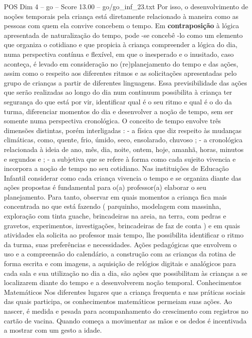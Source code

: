 \begin{textsample}{POS Dim 4 – go – Score 13.00 – go/go\_inf\_23.txt}
Por isso, o desenvolvimento de noções temporais pela criança está diretamente relacionado à maneira como as pessoas com quem ela convive concebem o tempo.
Em \textbf{contraposição} à lógica apresentada de naturalização do tempo, pode -se concebê -lo como um elemento que organiza o cotidiano e que propicia à criança compreender a lógica do dia, numa perspectiva contínua e flexível, em que o inesperado e o inusitado, caso aconteça, é levado em consideração no (re)planejamento do tempo e das ações, assim como o respeito aos diferentes ritmos e as solicitações apresentadas pelo grupo de crianças a partir de diferentes linguagens.
Essa previsibilidade das ações que serão realizadas ao longo do dia num continuum possibilita à criança ter segurança do que está por vir, identificar qual é o seu ritmo e qual é o do da turma, diferenciar momentos do dia e desenvolver a noção de tempo, sem ser somente numa perspectiva cronológica.
O conceito de tempo envolve três dimensões distintas, porém interligadas : - a física que diz respeito às mudanças climáticas, como, quente, frio, úmido, seco, ensolarado, chuvoso ; - a cronológica relacionada à ideia de ano, mês, dia, noite, ontem, hoje, amanhã, horas, minutos e segundos e ; - a subjetiva que se refere à forma como cada sujeito vivencia e incorpora a noção de tempo no seu cotidiano.
Nas instituições de Educação Infantil considerar como cada criança vivencia o tempo e se organiza diante das ações propostas é fundamental para o(a) professor(a) elaborar o seu planejamento.
Para tanto, observar em quais momentos a criança fica mais concentrada no que está fazendo ( parquinho, modelagem com massinha, exploração com tinta guache, brincadeiras na areia, na terra, com pedras e gravetos, experimentos, investigações, brincadeiras de faz de conta ) e em quais atividades ela solicita ao professor mais tempo, lhe possibilita identificar o ritmo da turma, suas preferências e necessidades.
Ações pedagógicas que envolvem o uso e a compreensão do calendário, a construção com as crianças da rotina de forma escrita e com imagens, a aquisição de relógios digitais e analógicos para cada sala e sua utilização no dia a dia, são ações que possibilitam às crianças a se localizarem diante do tempo e a desenvolverem noção temporal.
Conhecimentos Matemáticos Nos diferentes lugares que a criança frequenta e nas práticas sociais das quais participa, os conhecimentos matemáticos permeiam suas ações.
Ao nascer, é medida e pesada para acompanhamento do crescimento com registros no cartão de vacina.
Quando começa a movimentar as mãos e os dedos é incentivada a mostrar com um gesto a idade.

\end{textsample}

